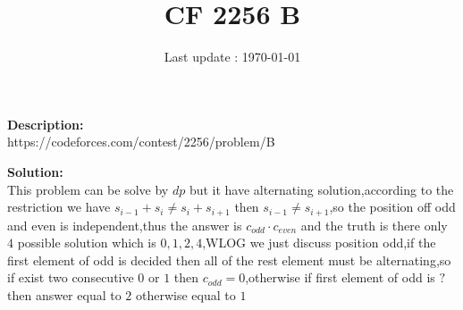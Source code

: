 \documentclass{article}
\begin{document}
\title{\textbf{CF 2256 B}}
\author{}
\date{Last update : \today}

\maketitle

\noindent \textbf{Description:}\\
https://codeforces.com/contest/2256/problem/B

\noindent \textbf{Solution:}\\
This problem can be solve by $dp$ but it have alternating solution,according to the restriction we have $s_{i-1}+s_i\ne s_i+s_{i+1}$ then $s_{i-1}\ne s_{i+1}$,so the position off odd and even is independent,thus the answer is $c_{odd} \cdot c_{even}$ and the truth is there only $4$ possible solution which is ${0,1,2,4}$,WLOG we just discuss position odd,if the first element of odd is decided then all of the rest element must be alternating,so if exist two consecutive $0$ or $1$ then $c_{odd}=0$,otherwise if first element of odd is $?$ then answer equal to $2$ otherwise equal to $1$
\end{document}
